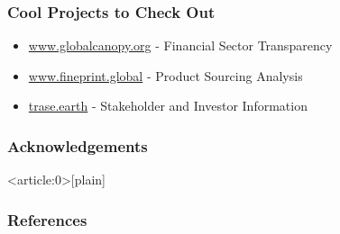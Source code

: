 \documentclass[aspectratio=169]{beamer}
\begin{document}
\begin{frame}
  \frametitle{Cool Projects to Check Out}
  \begin{itemize}
  \item \url{www.globalcanopy.org} - Financial Sector Transparency
  \item \url{www.fineprint.global} - Product Sourcing Analysis 
  \item \url{trase.earth} - Stakeholder and Investor Information
  \end{itemize}
\end{frame}





\begin{frame}
  \frametitle{Acknowledgements}
\end{frame}



{ %
    \begin{frame}<article:0>[plain]
      \frametitle{}
     \end{frame}
}

\begin{frame}
  \cite{Burgess2012}    
  \cite{Caggiani2014}
  \cite{Carvalho2019AdaptationSystems}
  \cite{Schaffer-Smith2018NetworkTrade}
\end{frame}


\begin{frame}[allowframebreaks]
  \frametitle{References}
  \tiny 
  
\end{frame}
\end{document}
